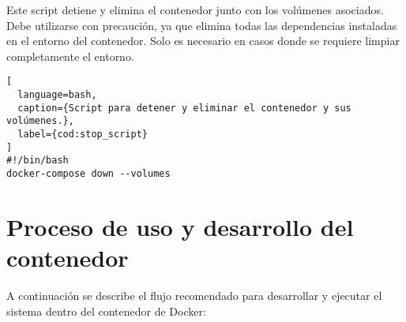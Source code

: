 Este script detiene y elimina el contenedor junto con los volúmenes asociados. Debe utilizarse con precaución, ya que elimina todas las dependencias instaladas en el entorno del contenedor. Solo es necesario en casos donde se requiere limpiar completamente el entorno.

\begin{lstlisting}[
  language=bash,
  caption={Script para detener y eliminar el contenedor y sus volúmenes.},
  label={cod:stop_script}
]
#!/bin/bash
docker-compose down --volumes
\end{lstlisting}

\section{Proceso de uso y desarrollo del contenedor}

A continuación se describe el flujo recomendado para desarrollar y ejecutar el sistema dentro del contenedor de Docker:

